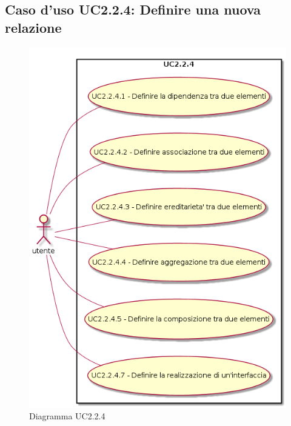\documentclass[../AnalisiDeiRequisiti.tex]{subfiles}
\begin{document}
	\subsection{Caso d'uso UC2.2.4: Definire una nuova relazione}
	\begin{figure} [H]
		\centering
		\includegraphics[scale=0.45]{./Figures/UC2-2-4.png}
		\caption{Diagramma UC2.2.4}\label{}
	\end{figure}
\end{document}
